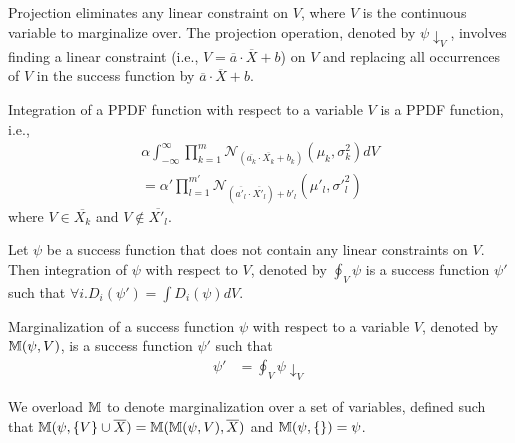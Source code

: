Projection eliminates any linear constraint on $V$, where $V$ is the continuous variable to marginalize over. The projection operation, denoted by $\psi\downarrow_{V}$, involves finding a linear constraint 
(i.e., $V = \overline{a} \cdot \overline{X}+b$) on $V$ and replacing all occurrences of $V$ in the success function by  $\overline{a} \cdot \overline{X}+b$.

\begin{Pro}
\label{integration}
Integration of a PPDF function with respect to a variable $V$ is a PPDF function, i.e., 
\begin{align*}
 \alpha \int^{\infty}_{-\infty} \prod_{k=1}^{m}
\mathcal{N}_{(\overline{a_{k}} \cdot
  \overline{X_{k}}+b_{k})}(\mu_{k},\sigma^{2}_{k}) dV \\= \alpha' \prod_{l=1}^{m'}
\mathcal{N}_{(\overline{a'_{l}} \cdot
  \overline{X'_{l}})+b'_{l}}(\mu'_{l},\sigma'^{2}_{l})
\end{align*}
where $V \in \overline{X_{k}}$ and $V \not\in \overline{X'_{l}}$.\\
\end{Pro}


\begin{Def} [Integration]
Let $\psi$ be a success function that does not contain any linear constraints on $V$. Then integration of $\psi$ with
 respect to $V$, denoted by $\oint_{V}\psi$ is a
success function $\psi'$ such that
$\forall i. D_{i}(\psi') = \int D_{i}(\psi) dV$.
\end{Def}


\begin{Def} [Marginalize]
Marginalization of a success function $\psi$ with respect to a
variable $V$, denoted by $\mathbb{M}(\psi, V)$, is a success
function $\psi'$ such that
\begin{align*}
\psi'  &= \oint_{V} \psi \downarrow_{V} 
\end{align*}
\end{Def}

We overload $\mathbb{M}$ to denote marginalization over a set of
variables, defined such that
$\mathbb{M}(\psi, \{V\} \cup \overline{X}) =
\mathbb{M}(\mathbb{M}(\psi, V), \overline{X})$ and
$\mathbb{M}(\psi, \{\}) = \psi$.

